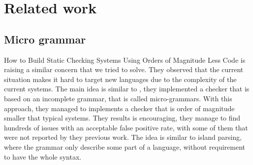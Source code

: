 \section{Related work}
\label{sec:related_work}

\subsection{Micro grammar}
\label{subsec:micro_grammar}

How to Build Static Checking Systems Using Orders of Magnitude Less Code \cite{Brown:2016:BSC:2954679.2872364} is raising a similar concern that we tried to solve. 
They observed that the current situation makes it hard to target new languages due to the complexity of the current systems. 
The main idea is similar to \slang, they implemented a checker that is based on an incomplete grammar, that is called micro-grammars.
With this approach, they managed to implements a checker that is order of magnitude smaller that typical systems. 
They results is encouraging, they manage to find hundreds of issues with an acceptable false positive rate, with some of them that were not reported by they previous work. 
The idea is similar to island parsing, where the grammar only describe some part of a language, without requirement to have the whole syntax.